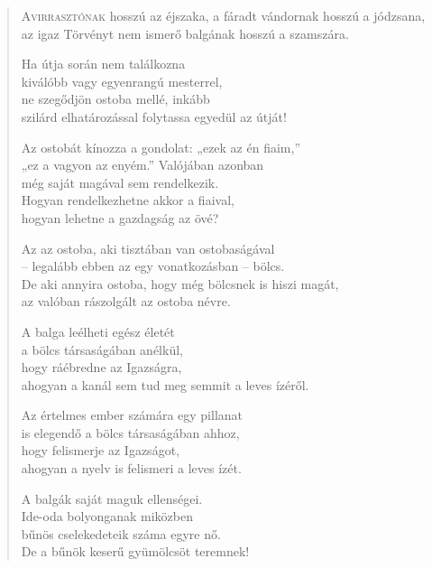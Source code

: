
\vspace*{-\baselineskip}
\begin{verse}

{\par%
\lettrine[slope=0.5em]{A}{virrasztónak} {\LettrineTextFont hosszú az éjszaka,}\newline
a fáradt vándornak hosszú a jódzsana,\newline
az igaz Törvényt nem ismerő\verselinebreak
balgának hosszú a szamszára.
\par}

 Ha útja során nem találkozna\\
kiválóbb vagy egyenrangú mesterrel,\\
ne szegődjön ostoba mellé, inkább\\
szilárd elhatározással folytassa egyedül az útját!

 Az ostobát kínozza a gondolat: „ezek az én fiaim,”\\
„ez a vagyon az enyém.” Valójában azonban\\
még saját magával sem rendelkezik.\\
Hogyan rendelkezhetne akkor a fiaival,\\
hogyan lehetne a gazdagság az övé?

 Az az ostoba, aki tisztában van ostobaságával\\
– legalább ebben az egy vonatkozásban – bölcs.\\
De aki annyira ostoba, hogy még bölcsnek is hiszi magát,\\
az valóban rászolgált az ostoba névre.

 A balga leélheti egész életét\\
a bölcs társaságában anélkül,\\
hogy ráébredne az Igazságra,\\
ahogyan a kanál sem tud meg semmit a leves ízéről.

 Az értelmes ember számára egy pillanat\\
is elegendő a bölcs társaságában ahhoz,\\
hogy felismerje az Igazságot,\\
ahogyan a nyelv is felismeri a leves ízét.

 A balgák saját maguk ellenségei.\\
Ide-oda bolyonganak miközben\\
bűnös cselekedeteik száma egyre nő.\\
De a bűnök keserű gyümölcsöt teremnek!


\end{verse}
